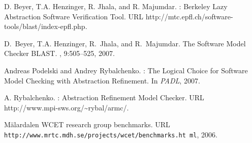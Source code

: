 
{\small

\begin{thebibliography}{10}
{D}. {B}eyer, {T}.{A}. {H}enzinger, {R}. {J}hala, and {R}. {M}ajumdar.
: {B}erkeley {L}azy {A}bstraction {S}oftware {V}erification
  {T}ool.
\newblock URL http://mtc.epfl.ch/software-tools/blast/index-epfl.php.

D.~Beyer, T.A. Henzinger, R.~Jhala, and R.~Majumdar.
\newblock The {S}oftware {M}odel {C}hecker {BLAST}.
, 9:505--525, 2007.

Andreas Podelski and Andrey Rybalchenko.
: {T}he {L}ogical {C}hoice for {S}oftware {M}odel {C}hecking
  with {A}bstraction {R}efinement.
\newblock In {\em PADL}, 2007.

{A}. {R}ybalchenko.
: {A}bstraction {R}efinement {M}odel {C}hecker.
\newblock URL http://www.mpi-sws.org/\~{}rybal/armc/.

M\"{a}lardalen {WCET} research group benchmarks.
\newblock URL {\tt
  h\-t\-t\-p://www.m\-r\-t\-c.m\-d\-h.se/pro\-jects/w\-c\-e\-t/bench\-marks.ht%
ml}, 2006.

\end{thebibliography}

}



